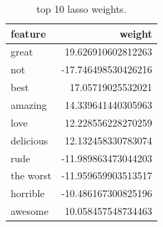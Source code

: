 \documentclass{article}
\begin{document}
\begin{table}[ht]
\centering
\begin{tabular}{lr}
\hline
\textbf{feature} & \textbf{weight} \\
\hline
great      & 19.626910602812263 \\
not        & -17.746498530426216 \\
best       & 17.05719025532021 \\
amazing    & 14.339641440305963 \\
love       & 12.228556228270259 \\
delicious  & 12.132458330783074 \\
rude       & -11.989863473044203 \\
the worst  & -11.959659903513517 \\
horrible   & -10.486167300825196 \\
awesome    & 10.058457548734463 \\
\hline
\end{tabular}
\caption{top 10 lasso weights.}
\label{tab:lasso_features}
\end{table}
\end{document}
